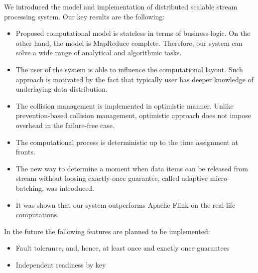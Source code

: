
\label {fs-conclusions}

We introduced the model and implementation of distributed scalable stream processing system. Our key results are the following:

\begin{itemize}
    \item Proposed computational model is stateless in terms of business-logic. On the other hand, the model is MapReduce complete. Therefore, our system can solve a wide range of analytical and algorithmic tasks.
    \item The user of the system is able to influence the computational layout. Such approach is motivated by the fact that typically user has deeper knowledge of underlaying data distribution.
    \item The collision management is implemented in optimistic manner. Unlike prevention-based collision management, optimistic approach does not impose overhead in the failure-free case.
    \item The computational process is deterministic up to the time assignment at fronts.
    \item The new way to determine a moment when data items can be released from stream without loosing exactly-once guarantee, called adaptive micro-batching, was introduced.  
    \item It was shown that our system outperforms Apache Flink on the real-life computations.   
\end{itemize}

In the future the following features are planned to be implemented:
\begin{itemize}
    \item Fault tolerance, and, hence, at least once and exactly once guarantees
    \item Independent readiness by key
\end{itemize}
